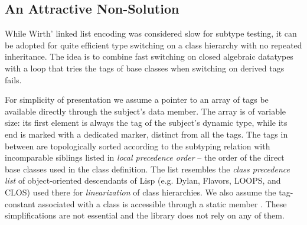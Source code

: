 \subsection{An Attractive Non-Solution}
\label{sec:cotc}



While Wirth' linked list encoding was considered slow for subtype testing, it can 
be adopted for quite efficient type switching on a class hierarchy with no 
repeated inheritance. The idea is to combine fast switching on closed 
algebraic datatypes with a loop that tries the tags of base classes when 
switching on derived tags fails.


For simplicity of presentation we assume a pointer to an array of tags be available 
directly through the subject's  data member. The array is of 
variable size: its first element is always the tag of the subject's dynamic 
type, while its end is marked with a dedicated  marker, 
distinct from all the tags. The tags in between are topologically sorted 
according to the subtyping relation with incomparable siblings listed in 
\emph{local precedence order} -- the order of the direct base classes used in 
the class definition. The list resembles the \emph{class precedence list} of 
object-oriented descendants of Lisp (e.g. Dylan, Flavors, LOOPS, and CLOS) used 
there for \emph{linearization} of class hierarchies. 
We also assume the tag-constant associated with a class  is accessible 
through a static member . These simplifications are not 
essential and the library does not rely on any of them.

